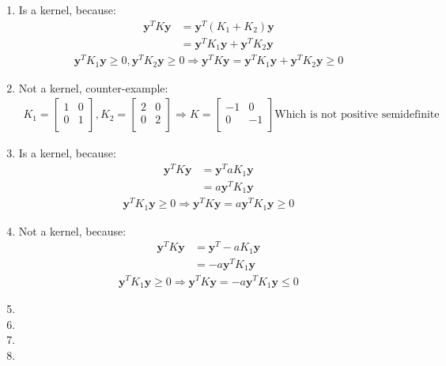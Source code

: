 \begin{answer}
\begin{enumerate}
\item 
Is a kernel, because:
\begin{align*}
\textbf{y}^TK\textbf{y}&=\textbf{y}^T(K_1+K_2)\textbf{y}\\
&=\textbf{y}^TK_1\textbf{y}+\textbf{y}^TK_2\textbf{y}
\end{align*}
\begin{align*}
\textbf{y}^TK_1\textbf{y}\geq0,\textbf{y}^TK_2\textbf{y}\geq0\Rightarrow \textbf{y}^TK\textbf{y}=\textbf{y}^TK_1\textbf{y}+\textbf{y}^TK_2\textbf{y}\geq0
\end{align*}
\item 
Not a kernel, counter-example:
\begin{align*}
K_1=
   \begin{bmatrix} 
   1&0\\ 
   0&1\\ 
   \end{bmatrix},
K_2=
   \begin{bmatrix} 
   2&0\\ 
   0&2\\ 
   \end{bmatrix}\Rightarrow
K=
   \begin{bmatrix} 
   -1&0\\ 
   0&-1\\ 
   \end{bmatrix} \text{Which is not positive semidefinite}
\end{align*}
\item 
Is a kernel, because:
\begin{align*}
\textbf{y}^TK\textbf{y}&=\textbf{y}^TaK_1\textbf{y}\\
&=a\textbf{y}^TK_1\textbf{y}
\end{align*}
\begin{align*}
\textbf{y}^TK_1\textbf{y}\geq0\Rightarrow\textbf{y}^TK\textbf{y}=a\textbf{y}^TK_1\textbf{y}\geq0
\end{align*}
\item 
Not a kernel, because:
\begin{align*}
\textbf{y}^TK\textbf{y}&=\textbf{y}^T-aK_1\textbf{y}\\
&=-a\textbf{y}^TK_1\textbf{y}
\end{align*}
\begin{align*}
\textbf{y}^TK_1\textbf{y}\geq0\Rightarrow\textbf{y}^TK\textbf{y}=-a\textbf{y}^TK_1\textbf{y}\leq0
\end{align*}
\item 
\item 
\item 
\item 
\end{enumerate}
\end{answer}
